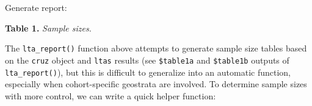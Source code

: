 \documentclass[
]{book}
\newenvironment{Shaded}{\begin{snugshade}}{\end{snugshade}}
\newcommand{\AttributeTok}[1]{\textcolor[rgb]{0.13,0.29,0.53}{#1}}
\newcommand{\ControlFlowTok}[1]{\textcolor[rgb]{0.13,0.29,0.53}{\textbf{#1}}}
\newcommand{\FunctionTok}[1]{\textcolor[rgb]{0.13,0.29,0.53}{\textbf{#1}}}
\newcommand{\NormalTok}[1]{#1}
\newcommand{\OtherTok}[1]{\textcolor[rgb]{0.56,0.35,0.01}{#1}}
\newcommand{\SpecialCharTok}[1]{\textcolor[rgb]{0.81,0.36,0.00}{\textbf{#1}}}
\begin{document}
Generate report:

\begin{Shaded}
\end{Shaded}

\textbf{Table 1.} \emph{Sample sizes.}

The \texttt{lta\_report()} function above attempts to generate sample size tables based on the \texttt{cruz} object and \texttt{ltas} results (see \texttt{\$table1a} and \texttt{\$table1b} outputs of \texttt{lta\_report()}), but this is difficult to generalize into an automatic function, especially when cohort-specific geostrata are involved. To determine sample sizes with more control, we can write a quick helper function:
\end{document}

